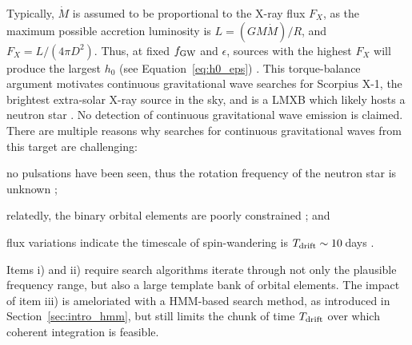 Typically, $\dot{M}$ is assumed to be proportional to the X-ray flux $F_X$, as the maximum possible accretion luminosity is $L=(GM\dot{M})/R$, and $F_X = L/(4\pi D^2)$. Thus, at fixed $f_{\rm GW}$ and $\epsilon$, sources with the highest $F_X$ will produce the largest $h_0$ (see Equation~\eqref{eq:h0_eps}) \citep{Wagoner1984,Bildsten1998}. This torque-balance argument motivates continuous gravitational wave searches for Scorpius X-1, the brightest extra-solar X-ray source in the sky, and is a LMXB which likely hosts a neutron star \citep{s6twoSpectScoXTE,o1crosscorSco,o1vitsco,o2vitsco,Zhang2021,o3vitsco,o3crosscorSco,Whelan2023}. No detection of continuous gravitational wave emission is claimed. There are multiple reasons why searches for continuous gravitational waves from this target are challenging: 
\begin{enumerate*}
    \item no pulsations have been seen, thus the rotation frequency of the neutron star is unknown \citep{Galaudage2022};
    \item relatedly, the binary orbital elements are poorly constrained \citep{Killestein2023}; and
    \item flux variations indicate the timescale of spin-wandering is $T_{\rm drift} \sim 10\,$days \citep{Mukherjee2018}.
\end{enumerate*}
Items i) and ii) require search algorithms iterate through not only the plausible frequency range, but also a large template bank of orbital elements. The impact of item iii) is ameloriated with a HMM-based search method, as introduced in Section~\ref{sec:intro_hmm}, but still limits the chunk of time $T_{\rm drift}$ over which coherent integration is feasible. 

